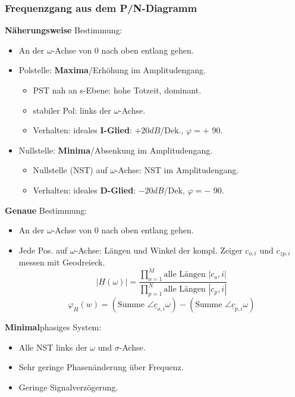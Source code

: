 \subsubsection{Frequenzgang aus dem P/N-Diagramm}
\textbf{Näherungsweise} Bestimmung:
\begin{itemize}
\item An der $\omega$-Achse von 0 nach oben entlang gehen.
\item Polstelle: \textbf{Maxima}/Erhöhung im Amplitudengang.
\begin{itemize}
	\item PST nah an s-Ebene: hohe Totzeit, dominant.
	\item stabiler Pol: links der $\omega$-Achse.
	\item Verhalten: ideales \textbf{I-Glied}: $+20dB$/Dek., $\varphi=+$ 90\textdegree.
\end{itemize}
\item Nullstelle: \textbf{Minima}/Absenkung im Amplitudengang.
\begin{itemize}
	\item Nullstelle (NST) auf $\omega$-Achse: NST im Amplitudengang.
	\item Verhalten: ideales \textbf{D-Glied}:  $-20dB$/Dek, $ \varphi=-$ 90\textdegree.
\end{itemize}

\end{itemize}
\textbf{Genaue} Bestimmung:
\begin{itemize}
	\item An der $\omega$-Achse von 0 nach oben entlang gehen.
	\item Jede Pos. auf $\omega$-Achse: Längen und Winkel der kompl. Zeiger $c_{o,i}$ und $c_{zp,i}$ messen mit Geodreieck.
	\[
	|\underline{H}(\omega)|=\frac{\prod_{o=1}^{M}\text{alle Längen } |c_o,i|}{\prod_{p=1}^{N}\text{alle Längen } |c_p,i|}
	\]
	\[
	\varphi_H(w)=(\text{Summe } \angle \underline{c}_{o,i}{\omega})-(\text{Summe } \angle \underline{c}_{p,i}{\omega})
	\]
\end{itemize}
\textbf{Minimal}phasiges System:
\begin{itemize}
	\item Alle NST links der $\omega$ und $\sigma$-Achse.
	\item Sehr geringe Phasen\"anderung \"uber Frequenz.
	\item Geringe Signalverz\"ogerung.
\end{itemize}

\clearpage
